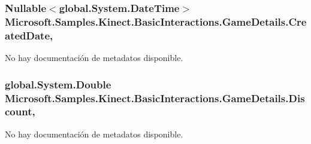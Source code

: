 \hypertarget{class_microsoft_1_1_samples_1_1_kinect_1_1_basic_interactions_1_1_game_details_aec5394110b7c86d9127ea34a12d19901}{
\subsubsection[{Created\-Date}]{\setlength{\rightskip}{0pt plus 5cm}Nullable$<$global.\-System.\-Date\-Time$>$ Microsoft.\-Samples.\-Kinect.\-Basic\-Interactions.\-Game\-Details.\-Created\-Date\hspace{0.3cm}{\ttfamily [get]}, {\ttfamily [set]}}}\label{class_microsoft_1_1_samples_1_1_kinect_1_1_basic_interactions_1_1_game_details_aec5394110b7c86d9127ea34a12d19901}


No hay documentación de metadatos disponible. 

\hypertarget{class_microsoft_1_1_samples_1_1_kinect_1_1_basic_interactions_1_1_game_details_a097d3609254c0b28d92ebf8178216cec}{
\subsubsection[{Discount}]{\setlength{\rightskip}{0pt plus 5cm}global.\-System.\-Double Microsoft.\-Samples.\-Kinect.\-Basic\-Interactions.\-Game\-Details.\-Discount\hspace{0.3cm}{\ttfamily [get]}, {\ttfamily [set]}}}\label{class_microsoft_1_1_samples_1_1_kinect_1_1_basic_interactions_1_1_game_details_a097d3609254c0b28d92ebf8178216cec}


No hay documentación de metadatos disponible. 

